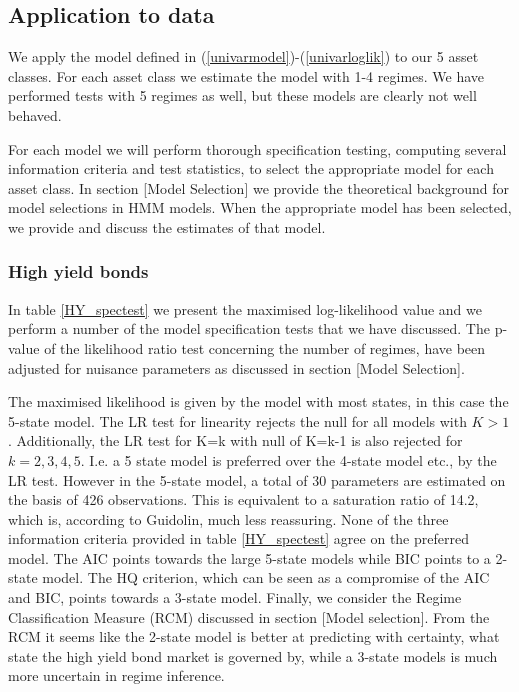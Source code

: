 \documentclass[11pt,a4paper,oneside]{article}
\begin{document}
\subsection{Application to data}  
\noindent We apply the model defined in  (\ref{univarmodel})-(\ref{univarloglik}) to our 5 asset classes. For each asset class we estimate the model with 1-4 regimes. We have performed tests with 5 regimes as well, but these models are clearly not well behaved. 

For each model we will perform thorough specification testing, computing several information criteria and test statistics, to select the appropriate model for each asset class. In section [Model Selection] we provide the theoretical background for model selections in HMM models. When the appropriate model has been selected, we provide and discuss the estimates of that model. 

\subsubsection*{High yield bonds}
\noindent In table \ref{HY_spectest} we present the maximised log-likelihood value and we perform a number of the model specification tests that we have discussed. The p-value of the likelihood ratio test concerning the number of regimes, have been adjusted for nuisance parameters as discussed in section [Model Selection]. 

The maximised likelihood is given by the model with most states, in this case the 5-state model. The LR test for linearity rejects the null for all models with $K>1$. Additionally, the LR test for K=k with null of K=k-1 is also rejected for $k=2,3,4,5$. I.e. a 5 state model is preferred over the 4-state model etc., by the LR test. However in the 5-state model, a total of 30 parameters are estimated on the basis of 426 observations. This is equivalent to a saturation ratio of 14.2, which is, according to Guidolin, much less reassuring. None of the three information criteria provided in table \ref{HY_spectest} agree on the preferred model. The AIC points towards the large 5-state models while BIC points to a 2-state model. The HQ criterion, which can be seen as a compromise of the AIC and BIC, points towards a 3-state model. Finally, we consider the Regime Classification Measure (RCM) discussed in section [Model selection]. From the RCM it seems like the 2-state model is better at predicting with certainty, what state the high yield bond market is governed by, while a 3-state models is much more uncertain in regime inference. 
\end{document}
